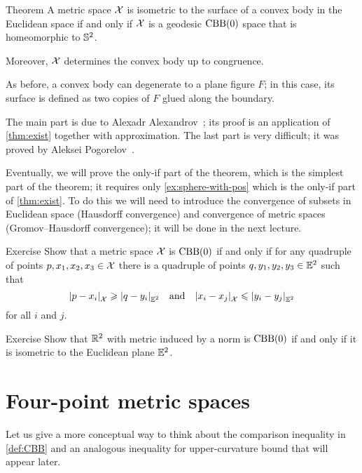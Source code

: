 \begin{thm}{Theorem}\label{thm:alexandrov+pogorelov}
A metric space $\mathcal{X}$ is isometric to the surface of a convex body in the Euclidean space if and only if $\mathcal{X}$ is a geodesic $\mathrm{CBB}(0)$ space that is homeomorphic to $\mathbb{S}^2$.

Moreover, $\mathcal{X}$ determines the convex body up to congruence.
\end{thm}

As before, a convex body can degenerate to a plane figure $F$;
in this case, its surface is defined as two copies of $F$ glued along the boundary.

The main part is due to Alexadr Alexandrov~\cite{alexandrov-1948};
its proof is an application of \ref{thm:exist} together with approximation.
The last part is very difficult; it was proved by Aleksei Pogorelov~\cite{pogorelov}.

Eventually, we will prove the only-if part of the theorem, which is the simplest part of the theorem;
it requires only \ref{ex:sphere-with-pos} which is
the only-if part of \ref{thm:exist}.
To do this we will need to introduce the convergence of subsets in Euclidean space (Hausdorff convergence) and convergence of metric spaces (Gromov--Hausdorff convergence); it will be done in the next lecture.

\begin{thm}{Exercise}\label{ex:(3+1)-expanding}
Show that a metric space $\mathcal{X}$ is $\mathrm{CBB}(0)$
if and only if for any quadruple of points $p,x_1,x_2,x_3\in \mathcal{X}$ 
there is a quadruple of points $q,y_1,y_2,y_3\in\mathbb{E}^2$
such that 
\[\dist{p}{x_i}{\spc{X}}\ge\dist{q}{y_i}{\EE^2} 
\quad \text{and}\quad
\dist{x_i}{x_j}{\spc{X}}\le\dist{y_i}{y_j}{\EE^2}\] 
for all $i$ and $j$.
\end{thm}

\begin{thm}{Exercise}\label{ex:normCBB}
Show that $\mathbb{R}^2$ with metric induced by a norm is $\mathrm{CBB}(0)$ if and only if it is isometric to the Euclidean plane $\mathbb{E}^2$.
\end{thm}

\section{Four-point metric spaces}

Let us give a more conceptual way to think about the comparison inequality in \ref{def:CBB} and an analogous inequality for upper-curvature bound that will appear later.


